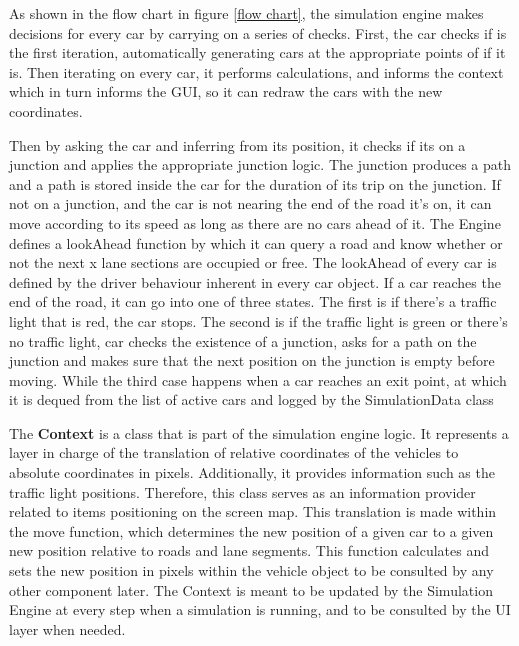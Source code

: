 \documentclass[11pt]{article}
\begin{document}
{\begin{itemize}
As shown in the flow chart in figure \ref{flow chart}, the simulation engine makes decisions for every car by carrying on a series of checks. First, the car checks if is the first iteration, automatically generating cars at the appropriate points of if it is. Then iterating on every car, it performs calculations, and informs  the context which in turn informs the GUI, so it can redraw the cars with the new coordinates. 

Then by asking the car and inferring from its position, it checks if its on a junction and applies the appropriate junction logic. The junction produces a path and a path is stored inside the car for the duration of its trip on the junction. If not on a junction, and the car is not nearing the end of the road it's on, it can move according to its speed as long as there are no cars ahead of it. The Engine defines a lookAhead function by which it can query a road and know whether or not the next x lane sections are occupied or free. The lookAhead of every car is defined by the driver behaviour inherent in every car object. If a car reaches the end of the road, it can go into one of three states. The first is  if there's a traffic light that is red, the car stops. The second is if the traffic light is green or there's no traffic light, car checks the existence of a junction, asks for a path on the junction and makes sure that the next position on the junction is empty before moving. While the third case happens when a car reaches an exit point, at which it is dequed from the list of active cars and logged by the SimulationData class 


The \textbf{Context} is a class that is part of the simulation engine logic. It represents a layer in charge of the translation of relative coordinates of the vehicles to absolute coordinates in pixels. Additionally, it provides information such as the traffic light positions. Therefore, this class serves as an information provider related to items positioning on the screen map.
This translation is made within the move function, which determines the new position of a given car to a given new position relative to roads and lane segments. This function calculates and sets the new position in pixels within the vehicle object to be consulted by any other component later.
The Context is meant to be updated by the Simulation Engine at every step when a simulation is running, and to be consulted by the UI layer when needed.




\end{itemize}}
\end{document}
